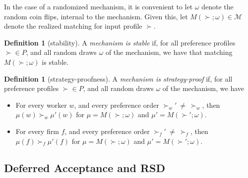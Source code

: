 \documentclass[11pt,letterpaper]{article}
\theoremstyle{definition}
\newtheorem{definition}[theorem]{Definition}
\newcommand{\kibitz}[2]{\ifnum\Comments=1{\color{#1}{#2}}\fi}
\newcommand{\dcp}[1]{\kibitz{orange}{[DCP: #1]}}
\begin{document}
  In the case of a randomized mechanism, it is
  convenient to let $\omega$ denote the random coin flips, internal to
  the mechanism.  Given this, let $M(\succ; \omega)\in \mathcal{M}$
  denote the realized matching for input profile $\succ$.
%
  \begin{definition}[stability]
    A {\em mechanism is stable} if, for all preference profiles
    $\succ\in P$, and  all random draws $\omega$ of the mechanism,
    we have that matching
    $M(\succ;\omega)$ is stable. 
  \end{definition}
\fi


  
  
  \begin{definition}[strategy-proofness]
  A {\em mechanism is strategy-proof} if, for all preference profiles
  $\succ\in P$, and all random draws $\omega$ of the mechanism, we have
  \begin{itemize}
    \item For every worker $w$, and every preference order $\succ_w'
     \  \neq\ \succ_w$,  then  $\mu(w)\succ_w\mu'(w)$ for
      $\mu=M(\succ;\omega)$ and $\mu'=M(\succ';\omega)$.
      \item For every firm $f$, and every preference order $\succ_f'
   \   \neq \ \succ_f$,  then  $\mu(f)\succ_f\mu'(f)$ for
      $\mu=M(\succ;\omega)$ and $\mu'=M(\succ';\omega)$.
    \end{itemize}
    \end{definition}
    
    \fi

\subsection{Deferred Acceptance and RSD}


\end{document}
